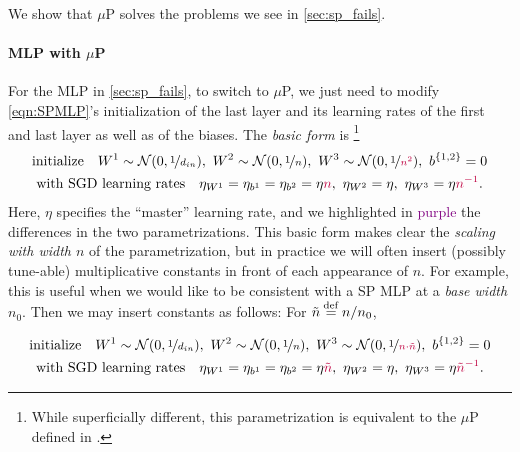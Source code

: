 \documentclass{article}
\theoremstyle{definition}
\newcommand{\highlight}[1]{\textcolor{purple}{#1}}
\begin{document}
We show that $\mu$P solves the problems we see in \cref{sec:sp_fails}.

\paragraph{MLP with $\mu$P}
For the MLP in \cref{sec:sp_fails}, to switch to $\mu$P, we just need to modify \cref{eqn:SPMLP}'s initialization of the last layer and its learning rates of the first and last layer as well as of the biases.
The \emph{basic form} is
\footnote{
  While superficially different, this parametrization is equivalent to the $\mu$P defined in \citep{TP4}.
}
\begin{equation}
  \begin{gathered}
  \text{initialize}\quad
        W^1\sim\mathcal{N}(0, \nicefrac{1}{d_{in}}),\ 
        W^{2}\sim\mathcal{N}(0, \nicefrac{1}{n}),\ 
        W^3 \sim \Gaus(0, \nicefrac 1 {\highlight{n^2}}),\ 
        b^{\{1,2\}}=0
        \\
  \text{with SGD learning rates}\quad
        \eta_{W^1} = \eta_{b^1} = \eta_{b^2} = \eta \highlight{n},\ 
        \eta_{W^2} = \eta,\ 
        \eta_{W^3} = \eta \highlight{n^{-1}}.
  \end{gathered}
  \label{eqn:MUPMLP}
\end{equation}
Here, $\eta$ specifies the ``master'' learning rate, and we highlighted in \highlight{purple} the differences in the two parametrizations.
This basic form makes clear the \emph{scaling with width $n$} of the parametrization, but in practice we will often insert (possibly tune-able) multiplicative constants in front of each appearance of $n$.
For example, this is useful when we would like to be consistent with a SP MLP at a \emph{base width} $n_0$.
Then we may insert constants as follows: For  $\tilde n \mathbin{\overset{\mathrm{def}}{=}} n / n_0$,

\begin{equation}
  \begin{gathered}
  \text{initialize}\quad
        W^1\sim\mathcal{N}(0, \nicefrac{1}{d_{in}}),\ 
        W^{2}\sim\mathcal{N}(0, \nicefrac{1}{n}),\ 
        W^3 \sim \Gaus(0, \nicefrac 1 {\highlight{n \cdot \tilde n}}),\ 
        b^{\{1,2\}}=0
        \\
  \text{with SGD learning rates}\quad
        \eta_{W^1} = \eta_{b^1} = \eta_{b^2} = \eta \highlight{\tilde n},\ 
        \eta_{W^2} = \eta,\ 
        \eta_{W^3} = \eta \highlight{\tilde n^{-1}}.
  \end{gathered}
  \label{eqn:MUPMLP_basewidth}
\end{equation}
\end{document}
